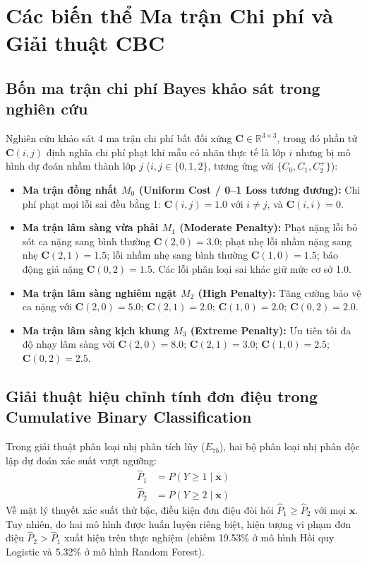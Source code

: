 \chapter{Các biến thể Ma trận Chi phí và Giải thuật CBC}
\label{app:cost-matrices}

\section{Bốn ma trận chi phí Bayes khảo sát trong nghiên cứu}
Nghiên cứu khảo sát 4 ma trận chi phí bất đối xứng $\mathbf{C} \in \mathbb{R}^{3 \times 3}$, trong đó phần tử $\mathbf{C}(i, j)$ định nghĩa chi phí phạt khi mẫu có nhãn thực tế là lớp $i$ nhưng bị mô hình dự đoán nhầm thành lớp $j$ ($i, j \in \{0, 1, 2\}$, tương ứng với $\{C_0, C_1, C_2^+\}$):
\begin{itemize}
    \item \textbf{Ma trận đồng nhất $M_0$ (Uniform Cost / 0--1 Loss tương đương):} Chi phí phạt mọi lỗi sai đều bằng 1: $\mathbf{C}(i, j) = 1.0$ với $i \ne j$, và $\mathbf{C}(i, i) = 0$.
    \item \textbf{Ma trận lâm sàng vừa phải $M_1$ (Moderate Penalty):} Phạt nặng lỗi bỏ sót ca nặng sang bình thường $\mathbf{C}(2, 0) = 3.0$; phạt nhẹ lỗi nhầm nặng sang nhẹ $\mathbf{C}(2, 1) = 1.5$; lỗi nhầm nhẹ sang bình thường $\mathbf{C}(1, 0) = 1.5$; báo động giả nặng $\mathbf{C}(0, 2) = 1.5$. Các lỗi phân loại sai khác giữ mức cơ sở 1.0.
    \item \textbf{Ma trận lâm sàng nghiêm ngặt $M_2$ (High Penalty):} Tăng cường bảo vệ ca nặng với $\mathbf{C}(2, 0) = 5.0$; $\mathbf{C}(2, 1) = 2.0$; $\mathbf{C}(1, 0) = 2.0$; $\mathbf{C}(0, 2) = 2.0$.
    \item \textbf{Ma trận lâm sàng kịch khung $M_3$ (Extreme Penalty):} Ưu tiên tối đa độ nhạy lâm sàng với $\mathbf{C}(2, 0) = 8.0$; $\mathbf{C}(2, 1) = 3.0$; $\mathbf{C}(1, 0) = 2.5$; $\mathbf{C}(0, 2) = 2.5$.
\end{itemize}

\section{Giải thuật hiệu chỉnh tính đơn điệu trong Cumulative Binary Classification}
Trong giải thuật phân loại nhị phân tích lũy ($E_{7b}$), hai bộ phân loại nhị phân độc lập dự đoán xác suất vượt ngưỡng:
\begin{align}
    \hat{P}_1 &= P(Y \ge 1 \mid \mathbf{x}) \\
    \hat{P}_2 &= P(Y \ge 2 \mid \mathbf{x})
\end{align}
Về mặt lý thuyết xác suất thứ bậc, điều kiện đơn điệu đòi hỏi $\hat{P}_1 \ge \hat{P}_2$ với mọi $\mathbf{x}$. Tuy nhiên, do hai mô hình được huấn luyện riêng biệt, hiện tượng vi phạm đơn điệu $\hat{P}_2 > \hat{P}_1$ xuất hiện trên thực nghiệm (chiếm 19.53\% ở mô hình Hồi quy Logistic và 5.32\% ở mô hình Random Forest). 

